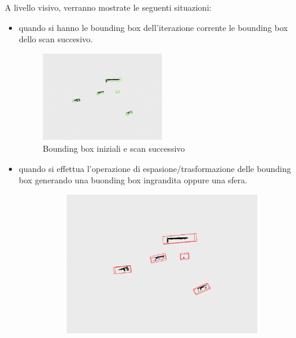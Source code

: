 \documentclass[italian]{article}
\begin{document}
A livello visivo, verranno mostrate le seguenti situazioni:
\begin{itemize}
	\item quando si hanno le bounding box dell'iterazione corrente le bounding box dello scan succesivo.
		\begin{figure}[H]
			\centering
			\includegraphics[width=0.5\textwidth]{startingpoint}
			\footnotesize
			\caption{Bounding box iniziali e scan successivo}
		\end{figure}
	\item quando si effettua l'operazione di espasione/trasformazione delle bounding box generando una buonding box ingrandita oppure una sfera.
		\begin{figure}[H]
			\centering
			\begin{subfigure}{0.45\textwidth}
				\includegraphics[width=\textwidth]{bbsExpanded}
			\end{subfigure}
			\begin{subfigure}{0.45\textwidth}

\end{subfigure}
\end{figure}
\end{itemize}
\end{document}
